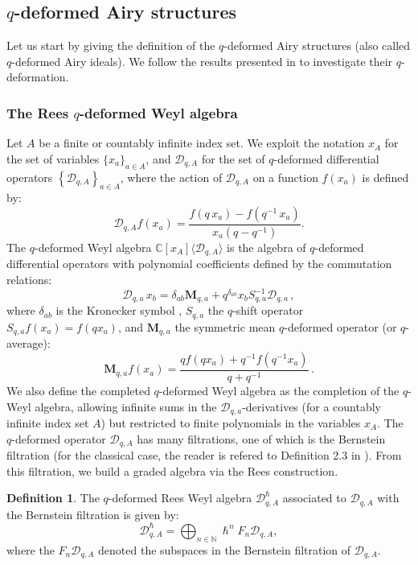 \documentclass[reqno,11pt]{amsart}
\theoremstyle{plain}
\theoremstyle{definition}
\newtheorem{definition}[theorem]{Definition}
\theoremstyle{remark}
\numberwithin{equation}{section}
\newcommand{\1}{\mathds{1}}
\newcommand{\2}{\frac{1}{2}}
\begin{document}
				\subsection{$q$-deformed Airy structures}
				Let us start by giving the definition of the $q$-deformed Airy structures (also called $q$-deformed Airy ideals). We follow the results presented in \cite{Bo24} to investigate their $q$-deformation.
				\subsubsection{The Rees $q$-deformed Weyl algebra}
				Let $A$ be a finite or countably infinite index set. We exploit the notation $x_A$ for the set of variables $\{x_a \}_{a \in A}$, and $\mathcal{D}_{q,A}$ for the set of $q$-deformed differential operators $\left\{ \mathcal{D}_{q,A} \right \}_{a \in A}$, where the action of $\mathcal{D}_{q,A}$  on a function $f(x_a)$ is defined by:
				{\begin{equation}
						\mathcal{D}_{q,A}f(x_a)=\frac{f(q\,x_a)-f(q^{-1}\,x_a)}{x_a(q-q^{-1})}.
				\end{equation}}
				The $q$-deformed Weyl algebra $ \mathbb{C}[x_A]\langle \mathcal{D}_{q,A} \rangle$ is the algebra of $q$-deformed differential operators with polynomial coefficients defined by the commutation relations:
				{\begin{equation}
						\mathcal{D}_{q,a} \, x_b = \delta_{ab} \mathbf{M}_{q,a} + q^{\delta_{ab}} x_b S_{q,a}^{-1} \mathcal{D}_{q,a} \,,
				\end{equation}} 
				where $\delta_{ab}$ is the Kronecker symbol {, $S_{q,a}$ the $q$-shift operator $S_{q,a} f(x_a) = f(q x_a)$, and $\mathbf{M}_{q,a}$  the symmetric mean $q$-deformed operator (or $q$-average):
					\begin{equation}
						\mathbf{M}_{q,a} f(x_a) = \frac{q f(q x_a) + q^{-1} f(q^{-1} x_a)}{q + q^{-1}} \,.
				\end{equation}}
				We also define the completed  $q$-deformed Weyl algebra %
				as the completion of the  $q$-Weyl algebra, allowing infinite sums in the $\mathcal{D}_{q,a}$-derivatives (for a countably infinite index set $A$) but restricted to finite polynomials in the variables $x_A$.  
				The $q$-deformed operator $\mathcal{D}_{q,A}$ has many filtrations, one of which is the Bernstein filtration (for the classical case, the reader is refered to  Definition 2.3 in \cite{Bo24}). From this filtration, we build a  graded algebra via the Rees construction.
				\begin{definition}\label{d:rees}
					The  $q$-deformed Rees Weyl algebra $\mathcal{D}_{q,A}^\hslash$ associated to $\mathcal{D}_{q,A}$ with the Bernstein filtration is given by:
					\begin{equation}
						\mathcal{D}_{q,A}^\hslash = \bigoplus_{n \in \mathbb{N}} \hslash^n F_n \mathcal{D}_{q,A},
					\end{equation}
					where the $F_n \mathcal{D}_{q,A}$ denoted the subspaces in the Bernstein filtration of $\mathcal{D}_{q,A}$.
				\end{definition}
\end{document}
